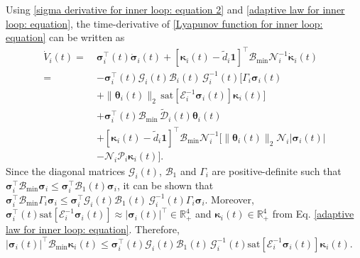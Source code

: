\documentclass[lettersize,journal]{IEEEtran}
\begin{document}
\noindent Using \eqref{sigma derivative for inner loop: equation 2} and \eqref{adaptive law for inner loop: equation}, the time-derivative of \eqref{Lyapunov function for inner loop: equation} can be written as
\begin{align}
\label{Lyapunov derivative for inner loop: equation 1}
    \dot{V}_i(t)=~&\boldsymbol{\sigma}_i^{\top}(t) \dot{\boldsymbol{\sigma}}_i(t) + \left[\boldsymbol{\kappa}_i(t) - \tilde{d}_{i} \boldsymbol{1}\right]^{\top} \mathcal{B}_{\text{min}} \mathcal{N}_i^{-1} \dot{\boldsymbol{\kappa}}_i(t)\nonumber\\
    = & - \boldsymbol{\sigma}_i^{\top}(t) \mathcal{G}_i(t) \mathcal{B}_i(t) \, \mathcal{G}_i^{-1}(t) \Big[\Gamma_i \boldsymbol{\sigma}_i(t) \nonumber \\ 
    & + \lVert \boldsymbol{\theta}_i(t) \rVert_2 \, \text{sat}[ \mathcal{E}_i^{-1}\boldsymbol{\sigma}_i(t)] \boldsymbol{\kappa}_i(t)\Big] \nonumber\\
    & + \boldsymbol{\sigma}_i^{\top}(t) \mathcal{B}_{\text{min}} \, \tilde{\mathcal{D}}_i(t) \boldsymbol{\theta}_i(t) \nonumber\\
    & + \left[\boldsymbol{\kappa}_i(t) - \tilde{d}_{i} \boldsymbol{1}\right]^{\top} \mathcal{B}_{\text{min}} \mathcal{N}_i^{-1} \Big[\lVert \boldsymbol{\theta}_i(t) \rVert_2 \mathcal{N}_{i} \lvert \boldsymbol{\sigma}_i(t) \rvert \nonumber\\
    & - \mathcal{N}_{i} \mathcal{P}_{i} \boldsymbol{\kappa}_i(t) \Big].
\end{align} 
Since the diagonal matrices $\mathcal{G}_i(t)$, $\mathcal{B}_{1}$ and $\Gamma_i$ are positive-definite such that $\boldsymbol{\sigma}_i^{\top} \mathcal{B}_{\text{min}} \boldsymbol{\sigma}_i \leq \boldsymbol{\sigma}_i^{\top}  \mathcal{B}_{1}(t) \boldsymbol{\sigma}_i$, it can be shown that $\boldsymbol{\sigma}_i^{\top} \mathcal{B}_{\text{min}} \Gamma_i \boldsymbol{\sigma}_i \leq \boldsymbol{\sigma}_i^{\top}  \mathcal{G}_i(t) \mathcal{B}_{1}(t) \, \mathcal{G}_i^{-1}(t) \Gamma_i \boldsymbol{\sigma}_i$.
Moreover, $\boldsymbol{\sigma}_i^{\top}(t) \text{sat}[ \mathcal{E}_i^{-1}\boldsymbol{\sigma}_i(t)] \approx \lvert \boldsymbol{\sigma}_i(t) \rvert^{\top} \in \mathbb{R}_+^4$ and $\boldsymbol{\kappa}_i(t) \in \mathbb{R}_+^4$ from Eq. \eqref{adaptive law for inner loop: equation}.
Therefore, $\lvert \boldsymbol{\sigma}_i(t) \rvert^{\top} \mathcal{B}_{\text{min}} \boldsymbol{\kappa}_i(t) \leq \boldsymbol{\sigma}_i^{\top}(t) \mathcal{G}_i(t) \mathcal{B}_{1}(t) \, \mathcal{G}_i^{-1}(t) \text{sat}[ \mathcal{E}_i^{-1}\boldsymbol{\sigma}_i(t)] \boldsymbol{\kappa}_i(t)$.
\end{document}
